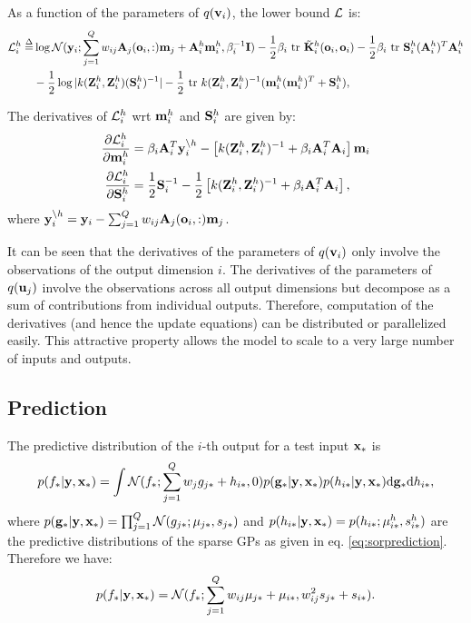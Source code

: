 \newcommand{\Lhi}{\calL^h_i}
\noindent As a function of the parameters of $q(\mathbf{v}_i)$, the lower bound $\mathcal{L}$ is:
\begin{align}
\nonumber
\Lhi \define&
 \log \Normal(\y_i; \sum_{j=1}^Q w_{ij} \A_j(\oi,:) \m_j + \Ahi \mhi, \beta_i^{-1} \I)
 - \frac{1}{2} \beta_i \trace \tilde{\K}^h_i(\oi,\oi)
 - \frac{1}{2} \beta_i \trace \Shi (\Ahi)^T \Ahi
 \\
  &- \frac{1}{2} \log |k(\Zhi,\Zhi) (\Shi)^{-1}| -\frac{1}{2} \trace k(\Zhi,\Zhi)^{-1} (\mhi (\mhi)^T + \Shi) ,
\end{align}

\noindent The derivatives of $\Lhi$ wrt $\mathbf{m}^h_i$ and $\mathbf{S}^h_i$ are given by:
\newcommand{\ynoh}{\y_i^{\backslash h}}
\begin{align}
\deriv{\Lhi}{\mhi}
& = \beta_i \A_i^T \ynoh - \left[k(\Zhi,\Zhi)^{-1} +  \beta_i \A_i^T \A_i \right] \m_i \\
\deriv{\Lhi}{\Shi} 
&= \frac{1}{2} \S_i^{-1} - \frac{1}{2} \left[ k(\Zhi,\Zhi)^{-1} + \beta_i \A_i^T \A_i \right] ,
\end{align}
where $\ynoh = \y_i - \sum_{j=1}^Q w_{ij} \A_j(\oi,:) \m_j$.

\noindent It can be seen that the derivatives of the parameters of $q(\mathbf{v}_i)$ only involve the observations of the output dimension $i$.
The derivatives of the parameters of $q(\mathbf{u}_j)$ involve the observations across all output dimensions but decompose as a sum of contributions from individual outputs.
Therefore, computation of the derivatives (and hence the update equations) can be distributed or parallelized easily.
This attractive property allows the model to scale to a very large number of inputs and outputs.


\subsection{Prediction}
The predictive distribution of the $i$-th output for a test input $\mathbf{x}_*$ is 
\begin{align}
p(f_* | \mathbf{y}, \mathbf{x}_*) = \int \mathcal{N}(f_*; \sum_{j=1}^Q w_j g_{j*} + h_{i*}, 0) p(\mathbf{g}_* | \mathbf{y}, \mathbf{x}_*) p(h_{i*} | \mathbf{y}, \mathbf{x}_*) \mathrm{d} \mathbf{g}_* \mathrm{d} h_{i*},
\end{align}
where $p(\mathbf{g}_* | \mathbf{y}, \mathbf{x}_*) = \prod_{j=1}^Q \mathcal{N}(g_{j*}; \mu_{j*}, s_{j*})$ and $p(h_{i*} | \mathbf{y}, \mathbf{x}_*) = p(h_{i*}; \mu^h_{i*}, s^h_{i*})$ are the predictive distributions of the sparse GPs as given in eq. \ref{eq:sorprediction}.
Therefore we have:
\begin{align}
p(f_* | \mathbf{y}, \mathbf{x}_*) = \mathcal{N}(f_*; \sum_{j=1}^Q w_{ij} \mu_{j*} + \mu_{i*}, w_{ij}^2 s_{j*} + s_{i*}). 
\end{align}


